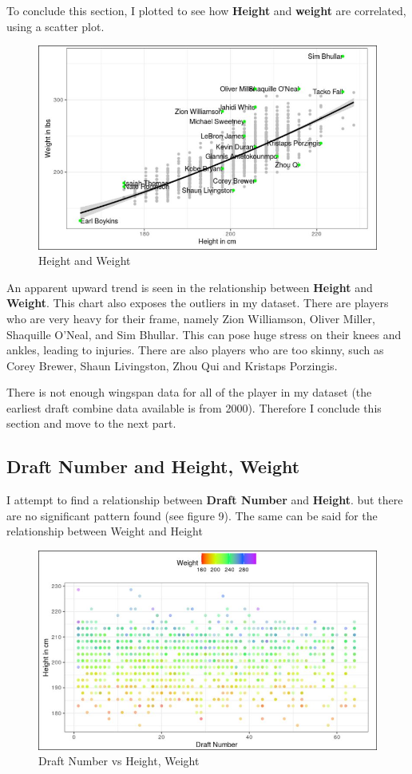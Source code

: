 \documentclass[a4paper,12pt,twoside]{article}
\numberwithin{equation}{section}
\begin{document}
To conclude this section, I plotted to see how \textbf{Height} and \textbf{weight} are correlated, using a scatter plot.
\begin{figure}[h]
\caption{Height and Weight}
\includegraphics[scale=0.33]{hvw.jpg}
\centering
\end{figure}

An apparent upward trend is seen in the relationship between \textbf{Height} and \textbf{Weight}. This chart also exposes the outliers in my dataset. There are players who are very heavy for their frame, namely Zion Williamson, Oliver Miller, Shaquille O'Neal, and Sim Bhullar. This can pose huge stress on their knees and ankles, leading to injuries. There are also players who are too skinny, such as Corey Brewer, Shaun Livingston, Zhou Qui and Kristaps Porzingis.

There is not enough wingspan data for all of the player in my dataset (the earliest draft combine data available is from 2000). Therefore I conclude this section and move to the next part.

\subsection{Draft Number and Height, Weight}

I attempt to find a relationship between \textbf{Draft Number} and \textbf{Height}. but there are no significant pattern found (see figure 9). The same can be said for the relationship between Weight and Height
\begin{figure}[h]
\caption{Draft Number vs Height, Weight}
\includegraphics[scale=0.34]{hvdrf.jpg}
\centering
\end{figure}
\end{document}

